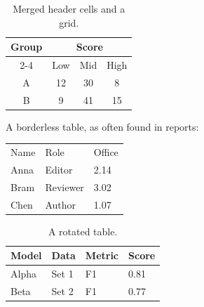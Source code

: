 \documentclass[11pt]{article}
\begin{document}
\begin{table}[h]
\centering
\caption{Merged header cells and a grid.}
\begin{tabular}{|c|c|c|c|}
\hline
\multirow{2}{*}{Group} & \multicolumn{3}{c|}{Score} \\ \cline{2-4}
 & Low & Mid & High \\ \hline
A & 12 & 30 & 8 \\ \hline
B & 9 & 41 & 15 \\ \hline
\end{tabular}
\end{table}

A borderless table, as often found in reports:

\begin{center}
\begin{tabular}{lll}
Name & Role & Office \\
Anna & Editor & 2.14 \\
Bram & Reviewer & 3.02 \\
Chen & Author & 1.07 \\
\end{tabular}
\end{center}

\begin{table}
\centering
\caption{A rotated table.}
\begin{tabular}{llll}
\toprule
Model & Data & Metric & Score \\
\midrule
Alpha & Set 1 & F1 & 0.81 \\
Beta & Set 2 & F1 & 0.77 \\
\bottomrule
\end{tabular}
\end{table}
\end{document}
